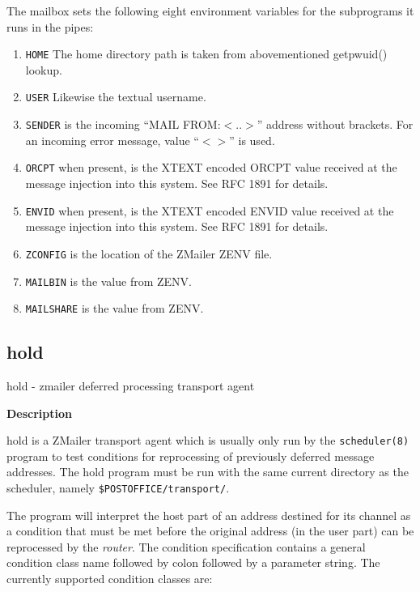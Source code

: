 The mailbox sets the following eight environment variables for the subprograms it runs 
in the pipes:
\begin{enumerate}
\item {\tt HOME} The home directory path is taken from abovementioned getpwuid()
lookup.
\item {\tt USER} Likewise the textual username.
\item {\tt SENDER} is the incoming ``MAIL FROM:{\(<\)}..{\(>\)}'' address without brackets. For
an incoming error message, value ``{\(<\)}{\(>\)}'' is used.
\item {\tt ORCPT} when present, is the XTEXT encoded ORCPT value received at the
message injection into this system. See RFC 1891 for details.
\item {\tt ENVID} when present, is the XTEXT encoded ENVID value received at the
message injection into this system. See RFC 1891 for details.
\item {\tt ZCONFIG} is the location of the ZMailer ZENV file.
\item {\tt MAILBIN} is the value from ZENV.
\item {\tt MAILSHARE} is the value from ZENV.
\end{enumerate}








\subsection{hold}



hold - zmailer deferred processing transport agent

{\bf Description}

hold is a ZMailer transport agent which is usually only
run by the {\tt scheduler(8)} program to test conditions for
reprocessing of previously deferred message addresses.
The hold program must be run with the same current directory 
as the scheduler, namely {\tt \$POSTOFFICE/transport/}.

The program will interpret the host part of an address
destined for its channel as a condition that must be met
before the original address (in the user part) can be
reprocessed by the {\em router}. The condition specification
contains a general condition class name followed by colon
followed by a parameter string. The currently supported
condition classes are:

